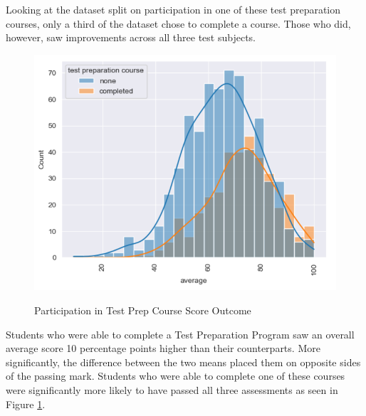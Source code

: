 \documentclass[man,floatsintext]{apa6} %
\begin{document}
Looking at the dataset split on participation in one of these test preparation courses, only a third of the dataset chose to complete a course. Those who did, however, saw improvements across all three test subjects.
\begin{figure}[H]
    \centering
    \caption{Participation in Test Prep Course Score Outcome}
    \includegraphics[width=0.7\linewidth]{TestPrepOverall.png}
    \label{fig:TestPrepOverall}
\end{figure}
Students who were able to complete a Test Preparation Program saw an overall average score 10 percentage points higher than their counterparts. More significantly, the difference between the two means placed them on opposite sides of the passing mark. Students who were able to complete one of these courses were significantly more likely to have passed all three assessments as seen in Figure \ref{fig:TestPrepOverall}.
\end{document}
